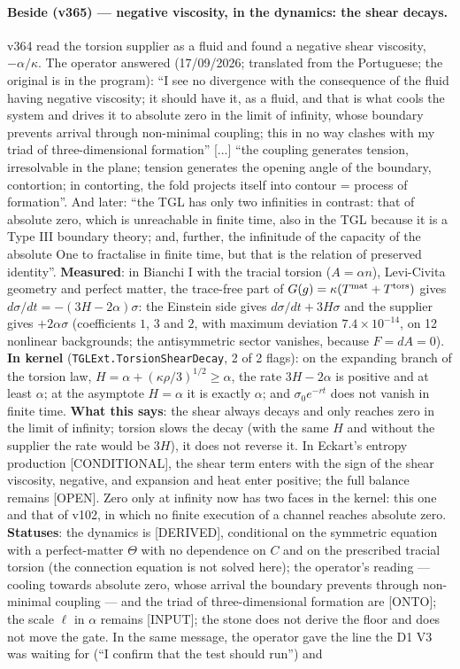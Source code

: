 \documentclass[11pt]{article}
\theoremstyle{definition}\newtheorem{deriv}{Derivation}
\begin{document}
\paragraph*{Beside (v365) --- negative viscosity, in the dynamics: the shear decays.} v364 read the torsion supplier as a fluid and found a negative shear viscosity, $-\alpha/\kappa$. The operator answered (17/09/2026; translated from the Portuguese; the original is in the program): ``I see no divergence with the consequence of the fluid having negative viscosity; it should have it, as a fluid, and that is what cools the system and drives it to absolute zero in the limit of infinity, whose boundary prevents arrival through non-minimal coupling; this in no way clashes with my triad of three-dimensional formation'' [...] ``the coupling generates tension, irresolvable in the plane; tension generates the opening angle of the boundary, contortion; in contorting, the fold projects itself into contour = process of formation''. And later: ``the TGL has only two infinities in contrast: that of absolute zero, which is unreachable in finite time, also in the TGL because it is a Type III boundary theory; and, further, the infinitude of the capacity of the absolute One to fractalise in finite time, but that is the relation of preserved identity''. \textbf{Measured}: in Bianchi I with the tracial torsion ($A=\alpha n$), Levi-Civita geometry and perfect matter, the trace-free part of $G(g)=\kappa(T^{\rm mat}+T^{\rm tors})$ gives $d\sigma/dt=-(3H-2\alpha)\sigma$: the Einstein side gives $d\sigma/dt+3H\sigma$ and the supplier gives $+2\alpha\sigma$ (coefficients $1$, $3$ and $2$, with maximum deviation $7.4\times10^{-14}$, on 12 nonlinear backgrounds; the antisymmetric sector vanishes, because $F=dA=0$). \textbf{In kernel} (\texttt{TGLExt.TorsionShearDecay}, 2 of 2 flags): on the expanding branch of the torsion law, $H=\alpha+(\kappa\rho/3)^{1/2}\ge\alpha$, the rate $3H-2\alpha$ is positive and at least $\alpha$; at the asymptote $H=\alpha$ it is exactly $\alpha$; and $\sigma_0e^{-rt}$ does not vanish in finite time. \textbf{What this says}: the shear always decays and only reaches zero in the limit of infinity; torsion slows the decay (with the same $H$ and without the supplier the rate would be $3H$), it does not reverse it. In Eckart's entropy production [CONDITIONAL], the shear term enters with the sign of the shear viscosity, negative, and expansion and heat enter positive; the full balance remains [OPEN]. Zero only at infinity now has two faces in the kernel: this one and that of v102, in which no finite execution of a channel reaches absolute zero. \textbf{Statuses}: the dynamics is [DERIVED], conditional on the symmetric equation with a perfect-matter $\Theta$ with no dependence on $C$ and on the prescribed tracial torsion (the connection equation is not solved here); the operator's reading --- cooling towards absolute zero, whose arrival the boundary prevents through non-minimal coupling --- and the triad of three-dimensional formation are [ONTO]; the scale $\ell$ in $\alpha$ remains [INPUT]; the stone does not derive the floor and does not move the gate. In the same message, the operator gave the line the D1 V3 was waiting for (``I confirm that the test should run'') and 
\end{document}
